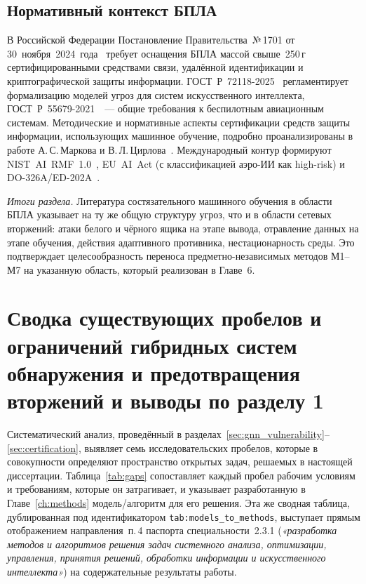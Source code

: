 \subsection{Нормативный контекст БПЛА}
В Российской Федерации Постановление Правительства~№\,1701 от
30~ноября~2024~года~\cite{decree_1701} требует оснащения БПЛА массой
свыше~250\,г сертифицированными средствами связи, удалённой
идентификации и криптографической защиты информации.
\mbox{ГОСТ~Р~72118-2025}~\cite{GOST_R_72118_2025} регламентирует
формализацию моделей угроз для систем искусственного интеллекта,
\mbox{ГОСТ~Р~55679-2021}~\cite{GOST_R_55679_2021}~--- общие требования
к беспилотным авиационным системам. Методические и нормативные
аспекты сертификации средств защиты информации, использующих
машинное обучение, подробно проанализированы в работе
А.\,С.\,Маркова и В.\,Л.\,Цирлова~\cite{Markov2023certify}. Международный контур
формируют \mbox{NIST~AI~RMF~1.0}~\cite{nist_rmf_2023},
\mbox{EU~AI~Act} (с классификацией аэро-ИИ как high-risk) и
\mbox{DO-326A/ED-202A}~\cite{do_326a_2024}.

\medskip
\noindent\textit{Итоги раздела.} Литература состязательного машинного
обучения в области БПЛА указывает на ту же общую структуру угроз, что
и в области сетевых вторжений: атаки белого и чёрного ящика на этапе
вывода, отравление данных на этапе обучения, действия адаптивного
противника, нестационарность среды. Это подтверждает целесообразность
переноса предметно-независимых методов \textsf{М1}--\textsf{М7} на
указанную область, который реализован в Главе~6.

\section{Сводка существующих пробелов и ограничений гибридных систем обнаружения и предотвращения вторжений и выводы по разделу 1}
\label{sec:gap_summary}

Систематический анализ, проведённый в разделах~\ref{sec:gnn_vulnerability}--\ref{sec:certification}, выявляет семь исследовательских пробелов, которые в совокупности определяют пространство открытых задач, решаемых в настоящей диссертации. Таблица~\ref{tab:gaps} сопоставляет каждый пробел рабочим условиям и требованиям, которые он затрагивает, и указывает разработанную в Главе~\ref{ch:methods} модель/алгоритм для его решения. Эта же сводная таблица, дублированная под идентификатором \texttt{tab:models\_to\_methods}, выступает прямым отображением направления~п.\,4 паспорта специальности~2.3.1 (\emph{«разработка методов и алгоритмов решения задач системного анализа, оптимизации, управления, принятия решений, обработки информации и искусственного интеллекта»}) на содержательные результаты работы.

